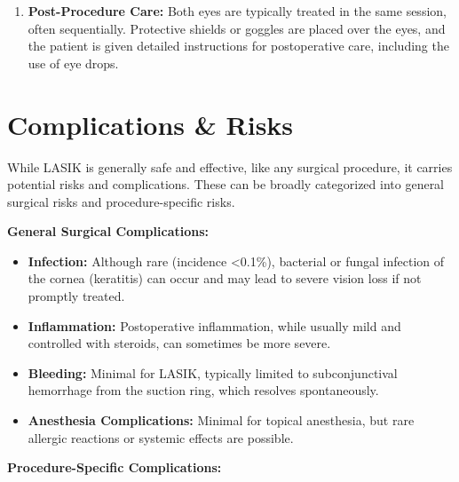 \begin{enumerate}
  \item \textbf{Post-Procedure Care:} Both eyes are typically treated in the same session, often sequentially. Protective shields or goggles are placed over the eyes, and the patient is given detailed instructions for postoperative care, including the use of eye drops.
\end{enumerate}

\section*{Complications \& Risks}
While LASIK is generally safe and effective, like any surgical procedure, it carries potential risks and complications. These can be broadly categorized into general surgical risks and procedure-specific risks.

\textbf{General Surgical Complications:}

\begin{itemize}
  \item \textbf{Infection:} Although rare (incidence <0.1\%), bacterial or fungal infection of the cornea (keratitis) can occur and may lead to severe vision loss if not promptly treated.
  
  \item \textbf{Inflammation:} Postoperative inflammation, while usually mild and controlled with steroids, can sometimes be more severe.
  
  \item \textbf{Bleeding:} Minimal for LASIK, typically limited to subconjunctival hemorrhage from the suction ring, which resolves spontaneously.
  
  \item \textbf{Anesthesia Complications:} Minimal for topical anesthesia, but rare allergic reactions or systemic effects are possible.
\end{itemize}

\textbf{Procedure-Specific Complications:}

